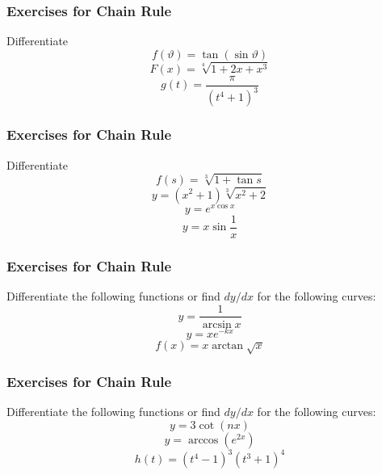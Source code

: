 \documentclass[xcolor=dvipsnames,handout]{beamer}
\begin{document}
\begin{frame}
  \frametitle{Exercises for Chain Rule}
{\ubung} Differentiate
\begin{equation}
  \label{eq:pimexeiz}
  f(\vartheta)=\tan(\sin{}\vartheta)
\end{equation}
\begin{equation}
  \label{eq:oogheica}
  F(x)=\sqrt[4]{1+2x+x^{3}}
\end{equation}
\begin{equation}
  \label{eq:ibagheab}
  g(t)=\frac{\pi}{(t^{4}+1)^{3}}
\end{equation}
\end{frame}

\begin{frame}
  \frametitle{Exercises for Chain Rule}
{\ubung} Differentiate
\begin{equation}
  \label{eq:oboohoca}
  f(s)=\sqrt[3]{1+\tan{}s}
\end{equation}
\begin{equation}
  \label{eq:choopaib}
  y=(x^{2}+1)\sqrt[3]{x^{2}+2}
\end{equation}
\begin{equation}
  \label{eq:uosiamei}
y=e^{x\cos{}x}  
\end{equation}
\begin{equation}
  \label{eq:oshaiphu}
  y=x\sin\frac{1}{x}
\end{equation}
\end{frame}

\begin{frame}
  \frametitle{Exercises for Chain Rule}
{\ubung} Differentiate the following functions or find $dy/dx$ for the
following curves:
\begin{equation}
  \label{eq:ciukaech}
  y=\frac{1}{\arcsin{}x}
\end{equation}
\begin{equation}
  \label{eq:oveagooy}
  y=xe^{-kx}
\end{equation}
\begin{equation}
  \label{eq:veeveema}
  f(x)=x\arctan\sqrt{x}
\end{equation}
\end{frame}

\begin{frame}
  \frametitle{Exercises for Chain Rule}
{\ubung} Differentiate the following functions or find $dy/dx$ for the
following curves:
\begin{equation}
  \label{eq:ciukaech}
  y=3\cot(nx)
\end{equation}
\begin{equation}
  \label{eq:oveagooy}
  y=\arccos\left(e^{2x}\right)
\end{equation}
\begin{equation}
  \label{eq:veeveema}
  h(t)=(t^{4}-1)^{3}(t^{3}+1)^{4}
\end{equation}
\end{frame}
\end{document}
